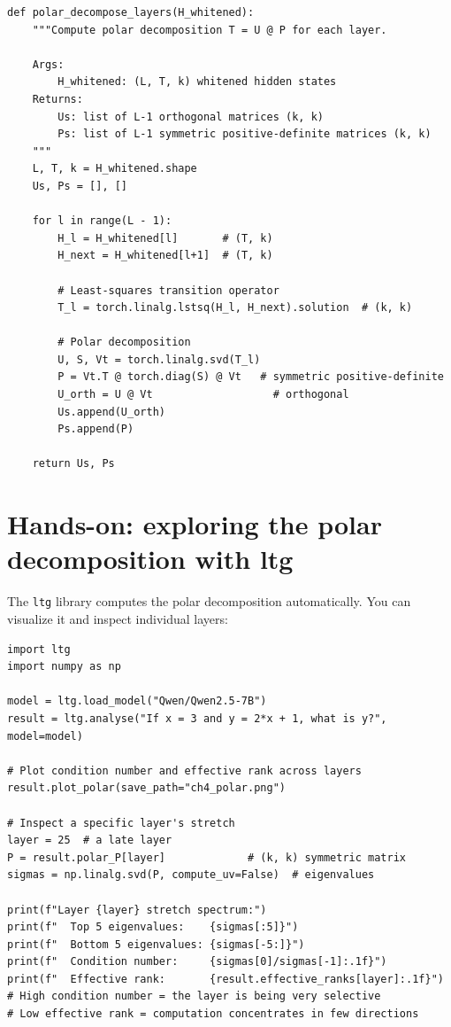 \documentclass[11pt, twoside, openright]{memoir}
\begin{document}
\begin{lstlisting}[caption={Polar decomposition of layer transitions}]
def polar_decompose_layers(H_whitened):
    """Compute polar decomposition T = U @ P for each layer.

    Args:
        H_whitened: (L, T, k) whitened hidden states
    Returns:
        Us: list of L-1 orthogonal matrices (k, k)
        Ps: list of L-1 symmetric positive-definite matrices (k, k)
    """
    L, T, k = H_whitened.shape
    Us, Ps = [], []

    for l in range(L - 1):
        H_l = H_whitened[l]       # (T, k)
        H_next = H_whitened[l+1]  # (T, k)

        # Least-squares transition operator
        T_l = torch.linalg.lstsq(H_l, H_next).solution  # (k, k)

        # Polar decomposition
        U, S, Vt = torch.linalg.svd(T_l)
        P = Vt.T @ torch.diag(S) @ Vt   # symmetric positive-definite
        U_orth = U @ Vt                   # orthogonal
        Us.append(U_orth)
        Ps.append(P)

    return Us, Ps
\end{lstlisting}

\section{Hands-on: exploring the polar decomposition with ltg}

The \texttt{ltg} library computes the polar decomposition automatically. You
can visualize it and inspect individual layers:

\begin{lstlisting}[caption={Polar decomposition analysis with ltg}]
import ltg
import numpy as np

model = ltg.load_model("Qwen/Qwen2.5-7B")
result = ltg.analyse("If x = 3 and y = 2*x + 1, what is y?", model=model)

# Plot condition number and effective rank across layers
result.plot_polar(save_path="ch4_polar.png")

# Inspect a specific layer's stretch
layer = 25  # a late layer
P = result.polar_P[layer]             # (k, k) symmetric matrix
sigmas = np.linalg.svd(P, compute_uv=False)  # eigenvalues

print(f"Layer {layer} stretch spectrum:")
print(f"  Top 5 eigenvalues:    {sigmas[:5]}")
print(f"  Bottom 5 eigenvalues: {sigmas[-5:]}")
print(f"  Condition number:     {sigmas[0]/sigmas[-1]:.1f}")
print(f"  Effective rank:       {result.effective_ranks[layer]:.1f}")
# High condition number = the layer is being very selective
# Low effective rank = computation concentrates in few directions
\end{lstlisting}
\end{document}
